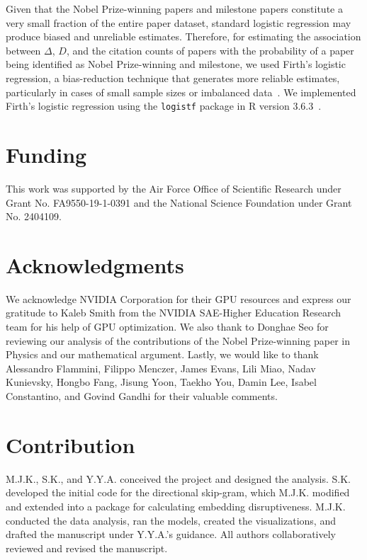 \documentclass[12pt]{article}
\begin{document}
\begin{refsection}
Given that the Nobel Prize-winning papers and milestone papers constitute a very small fraction of the entire paper dataset, standard logistic regression may produce biased and unreliable estimates. Therefore, for estimating the association between $\Delta$, $D$, and the citation counts of papers with the probability of a paper being identified as Nobel Prize-winning and milestone, we used Firth's logistic regression, a bias-reduction technique that generates more reliable estimates, particularly in cases of small sample sizes or imbalanced data~\cite{firth1993bias}. We implemented Firth's logistic regression using the \texttt{logistf} package in R version 3.6.3~\cite{firth_package}. 


\printbibliography[ resetnumbers=false,  title={Methods References}]
\end{refsection}




\section*{Funding}
This work was supported by the Air Force Office of Scientific Research under Grant No. FA9550-19-1-0391 and the National Science Foundation under Grant No. 2404109.


\section*{Acknowledgments}


We acknowledge NVIDIA Corporation for their GPU resources and express our gratitude to Kaleb Smith from the NVIDIA SAE-Higher Education Research team for his help of GPU optimization. We also thank to Donghae Seo for reviewing our analysis of the contributions of the Nobel Prize-winning paper in Physics and our mathematical argument. Lastly, we would like to thank Alessandro Flammini, Filippo Menczer, James Evans, Lili Miao, Nadav Kunievsky, Hongbo Fang, Jisung Yoon, Taekho You, Damin Lee, Isabel Constantino, and Govind Gandhi for their valuable comments. 


\section*{Contribution}

M.J.K., S.K., and Y.Y.A. conceived the project and designed the analysis. S.K. developed the initial code for the directional skip-gram, which M.J.K. modified and extended into a package for calculating embedding disruptiveness. M.J.K. conducted the data analysis, ran the models, created the visualizations, and drafted the manuscript under Y.Y.A.'s guidance. All authors collaboratively reviewed and revised the manuscript.
\end{document}
